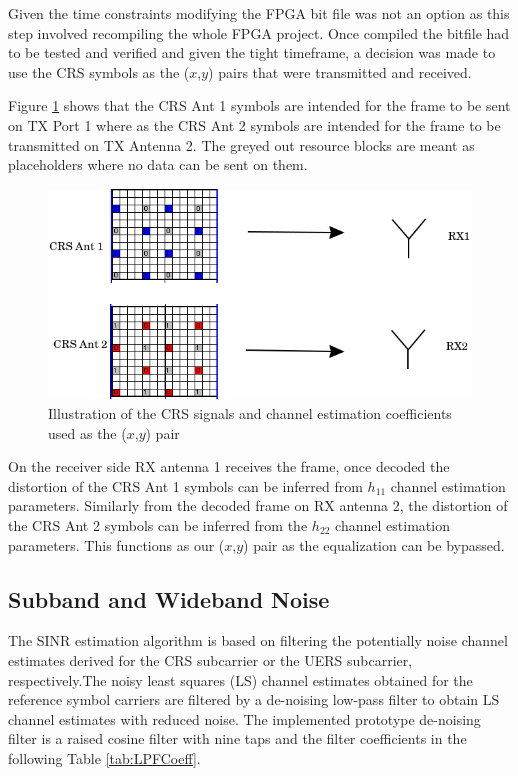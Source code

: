 Given the time constraints modifying the FPGA bit file was not an option as this step involved recompiling the whole FPGA project. Once compiled the bitfile had to be tested and verified and given the tight timeframe, a decision was made to use the CRS symbols as the ($x$,$y$) pairs that were transmitted and received.

Figure \ref{fig:XYPairsCRS} shows that the CRS Ant 1 symbols are intended for the frame to be sent on TX Port 1 where as the CRS Ant 2 symbols are intended for the frame to be transmitted on TX Antenna 2. The greyed out resource blocks are meant as placeholders where no data can be sent on them.

\begin{figure}[!htb]
    \centering
    \includegraphics[width=\linewidth]{images/MultiAntennaCRSXYPairEdited.png}
    \caption{Illustration of the CRS signals and channel estimation coefficients used as the ($x$,$y$) pair}
    \label{fig:XYPairsCRS}
\end{figure}

On the receiver side RX antenna 1 receives the frame, once decoded the distortion of the CRS Ant 1 symbols can be inferred from $h_{11}$ channel estimation parameters. Similarly from the decoded frame on RX antenna 2, the distortion of the CRS Ant 2 symbols can be inferred from the $h_{22}$ channel estimation parameters. This functions as our ($x$,$y$) pair as the equalization can be bypassed.

\subsection{Subband and Wideband Noise}\label{ssec:SINR}

The SINR estimation algorithm is based on filtering the potentially noise channel estimates derived for the CRS subcarrier or the UERS subcarrier, respectively.The noisy least squares (LS) channel estimates obtained for the reference symbol carriers are filtered by a de-noising low-pass filter to obtain LS channel estimates with reduced noise. The implemented prototype de-noising filter is a raised cosine filter with nine taps and the filter coefficients in the following Table \ref{tab:LPFCoeff}.

